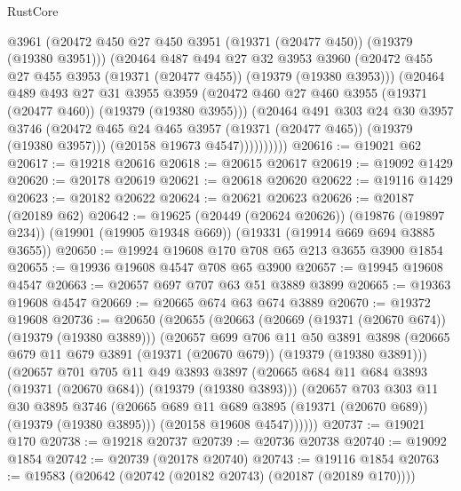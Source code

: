 \begin{lexlean}{RustCore}
\begin{coremodule}
                @3961
                (@20472 @450 @27 @450 @3951 (@19371 (@20477 @450)) (@19379 (@19380 @3951)))
                (@20464
                  @487
                  @494
                  @27
                  @32
                  @3953
                  @3960
                  (@20472 @455 @27 @455 @3953 (@19371 (@20477 @455)) (@19379 (@19380 @3953)))
                  (@20464
                    @489
                    @493
                    @27
                    @31
                    @3955
                    @3959
                    (@20472 @460 @27 @460 @3955 (@19371 (@20477 @460)) (@19379 (@19380 @3955)))
                    (@20464
                      @491
                      @303
                      @24
                      @30
                      @3957
                      @3746
                      (@20472 @465 @24 @465 @3957 (@19371 (@20477 @465)) (@19379 (@19380 @3957)))
                      (@20158 @19673 @4547))))))))))
@20616 := @19021 @62
@20617 := @19218 @20616
@20618 := @20615 @20617
@20619 := @19092 @1429
@20620 := @20178 @20619
@20621 := @20618 @20620
@20622 := @19116 @1429
@20623 := @20182 @20622
@20624 := @20621 @20623
@20626 := @20187 (@20189 @62)
@20642 := @19625
    (@20449 (@20624 @20626))
    (@19876 (@19897 @234))
    (@19901 (@19905 @19348 @669))
    (@19331 (@19914 @669 @694 @3885 @3655))
@20650 := @19924 @19608 @170 @708 @65 @213 @3655 @3900 @1854
@20655 := @19936 @19608 @4547 @708 @65 @3900
@20657 := @19945 @19608 @4547
@20663 := @20657 @697 @707 @63 @51 @3889 @3899
@20665 := @19363 @19608 @4547
@20669 := @20665 @674 @63 @674 @3889
@20670 := @19372 @19608
@20736 := @20650
    (@20655
      (@20663
        (@20669 (@19371 (@20670 @674)) (@19379 (@19380 @3889)))
        (@20657
          @699
          @706
          @11
          @50
          @3891
          @3898
          (@20665 @679 @11 @679 @3891 (@19371 (@20670 @679)) (@19379 (@19380 @3891)))
          (@20657
            @701
            @705
            @11
            @49
            @3893
            @3897
            (@20665 @684 @11 @684 @3893 (@19371 (@20670 @684)) (@19379 (@19380 @3893)))
            (@20657
              @703
              @303
              @11
              @30
              @3895
              @3746
              (@20665 @689 @11 @689 @3895 (@19371 (@20670 @689)) (@19379 (@19380 @3895)))
              (@20158 @19608 @4547))))))
@20737 := @19021 @170
@20738 := @19218 @20737
@20739 := @20736 @20738
@20740 := @19092 @1854
@20742 := @20739 (@20178 @20740)
@20743 := @19116 @1854
@20763 := @19583
    (@20642 (@20742 (@20182 @20743) (@20187 (@20189 @170))))

\end{coremodule}
\end{lexlean}

